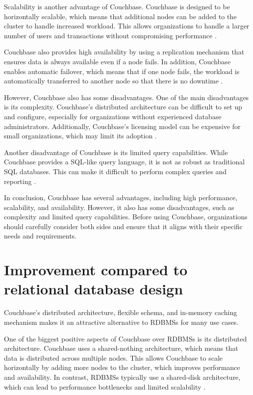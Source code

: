 Scalability is another advantage of Couchbase. Couchbase is designed to be horizontally scalable, which means that additional nodes can be added to the cluster to handle increased workload. This allows organizations to handle a larger number of users and transactions without compromising performance \parencite{Couchbase.20230414, Couchbase.Review, CouchbaseArchitecturalAdvantages}.

Couchbase also provides high availability by using a replication mechanism that ensures data is always available even if a node fails. In addition, Couchbase enables automatic failover, which means that if one node fails, the workload is automatically transferred to another node so that there is no downtime \parencite{Couchbase.20230414, Couchbase.Review, CouchbaseArchitecturalAdvantages}.

However, Couchbase also has some disadvantages. One of the main disadvantages is its complexity. Couchbase's distributed architecture can be difficult to set up and configure, especially for organizations without experienced database administrators. Additionally, Couchbase's licensing model can be expensive for small organizations, which may limit its adoption \parencite{CouchbaseDisadvantages, CouchbaseProsAndCons}.

Another disadvantage of Couchbase is its limited query capabilities. While Couchbase provides a \ac{SQL}-like query language, it is not as robust as traditional \ac{SQL} databases. This can make it difficult to perform complex queries and reporting \parencite{CouchbaseDisadvantages, CouchbaseCons}.

In conclusion, Couchbase has several advantages, including high performance, scalability, and availability. However, it also has some disadvantages, such as complexity and limited query capabilities. Before using Couchbase, organizations should carefully consider both sides and ensure that it aligns with their specific needs and requirements.

\section{Improvement compared to relational database design}

Couchbase's distributed architecture, flexible schema, and in-memory caching mechanism makes it an attractive alternative to \acp{RDBMS} for many use cases.

One of the biggest positive aspects of Couchbase over \acp{RDBMS} is its distributed architecture. Couchbase uses a shared-nothing architecture, which means that data is distributed across multiple nodes. This allows Couchbase to scale horizontally by adding more nodes to the cluster, which improves performance and availability. In contrast, \acp{RDBMS} typically use a shared-disk architecture, which can lead to performance bottlenecks and limited scalability \parencite{CouchbaseVsRelational, ComparingDatabases, DifferencesBetweenDatabases}.

